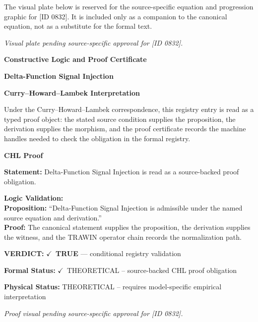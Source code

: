 \begingroup\footnotesize\sloppy
The visual plate below is reserved for the source-specific equation and progression graphic for [ID 0832]. It is included only as a companion to the canonical equation, not as a substitute for the formal text.
\par\endgroup
\begingroup\footnotesize\itshape
Visual plate pending source-specific approval for [ID 0832].
\par\endgroup

\clearpage
\begingroup\tzpsupportsetup
\noindent\textbf{\fontsize{10.8pt}{12.8pt}\selectfont [ID 0832] Constructive Logic and Proof Certificate}\par
\noindent\textbf{\fontsize{10pt}{12pt}\selectfont Delta-Function Signal Injection}\par
\vspace{0.45em}
\begingroup
\footnotesize
\setlength{\parskip}{0.22em}
\setlength{\parindent}{0pt}
\noindent\textbf{Curry--Howard--Lambek Interpretation}\par
Under the Curry--Howard--Lambek correspondence, this registry entry is read as a typed proof
object: the stated source condition supplies the proposition, the derivation supplies the
morphism, and the proof certificate records the machine handles needed to check the obligation
in the formal registry.

\vspace{0.45em}
\noindent\textbf{CHL Proof}\par
\textbf{Statement:} Delta-Function Signal Injection is read as a source-backed proof obligation.

\textbf{Logic Validation:}\\
\textbf{Proposition:} ``Delta-Function Signal Injection is admissible under the named source equation and derivation.''\\
\textbf{Proof:} The canonical statement supplies the proposition, the derivation supplies the witness, and the TRAWIN operator chain records the normalization path.

\textbf{VERDICT:} \ensuremath{\checkmark}\ \textbf{TRUE} --- conditional registry validation

\textbf{Formal Status:} \ensuremath{\checkmark}\ THEORETICAL -- source-backed CHL proof obligation

\textbf{Physical Status:} THEORETICAL -- requires model-specific empirical interpretation
\par\vspace{0.45em}
\par
\vfill
\begingroup\footnotesize\itshape
Proof visual pending source-specific approval for [ID 0832].
\par\endgroup
\vfill
\endgroup
\endgroup
